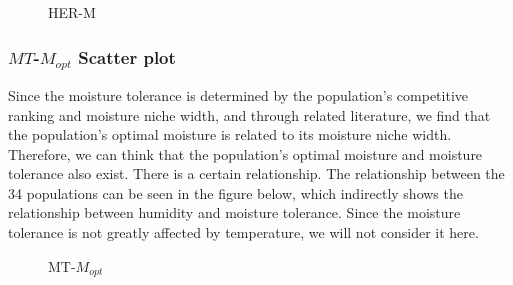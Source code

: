 \documentclass{mcmthesis}
\begin{document}
\begin{figure}[h]
	\caption{HER-M}
\end{figure}

\newpage
\subsubsection{$MT$-$M_{opt}$ Scatter plot}
Since the moisture tolerance is determined by the population’s competitive ranking and moisture niche width, and through related literature, we find that the population’s optimal moisture is related to its moisture niche width. Therefore, we can think that the population’s optimal moisture and moisture tolerance also exist. There is a certain relationship. The relationship between the 34 populations can be seen in the figure below, which indirectly shows the relationship between humidity and moisture tolerance. Since the moisture tolerance is not greatly affected by temperature, we will not consider it here.
\begin{figure}[h]
	\caption{MT-$M_{opt}$}
\end{figure}
\newpage
\end{document}
